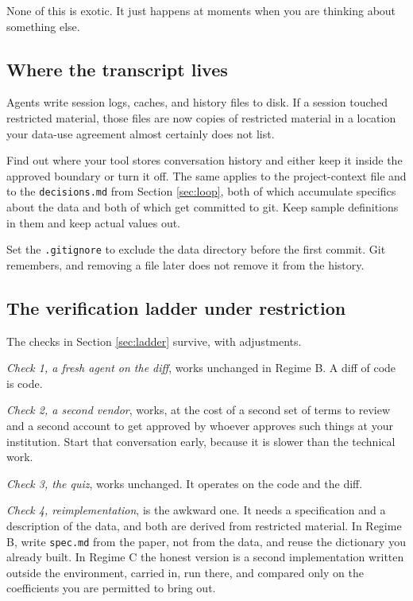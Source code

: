 \documentclass[11pt,a4paper]{article}
\newcommand{\code}[1]{\texttt{\small #1}}
\begin{document}
None of this is exotic. It just happens at moments when you are thinking about
something else.

\subsection{Where the transcript lives}

Agents write session logs, caches, and history files to disk. If a session
touched restricted material, those files are now copies of restricted material in
a location your data-use agreement almost certainly does not list.

Find out where your tool stores conversation history and either keep it inside
the approved boundary or turn it off. The same applies to the project-context
file and to the \code{decisions.md} from Section \ref{sec:loop}, both of which
accumulate specifics about the data and both of which get committed to git. Keep
sample definitions in them and keep actual values out.

Set the \code{.gitignore} to exclude the data directory before the first commit.
Git remembers, and removing a file later does not remove it from the history.

\subsection{The verification ladder under restriction}

The checks in Section \ref{sec:ladder} survive, with adjustments.

\emph{Check 1, a fresh agent on the diff}, works unchanged in Regime B. A diff of
code is code.

\emph{Check 2, a second vendor}, works, at the cost of a second set of terms to
review and a second account to get approved by whoever approves such things at
your institution. Start that conversation early, because it is slower than the
technical work.

\emph{Check 3, the quiz}, works unchanged. It operates on the code and the diff.

\emph{Check 4, reimplementation}, is the awkward one. It needs a specification
and a description of the data, and both are derived from restricted material. In
Regime B, write \code{spec.md} from the paper, not from the data, and
reuse the dictionary you already built. In Regime C the honest version is a
second implementation written outside the environment, carried in, run there, and
compared only on the coefficients you are permitted to bring out.
\end{document}

